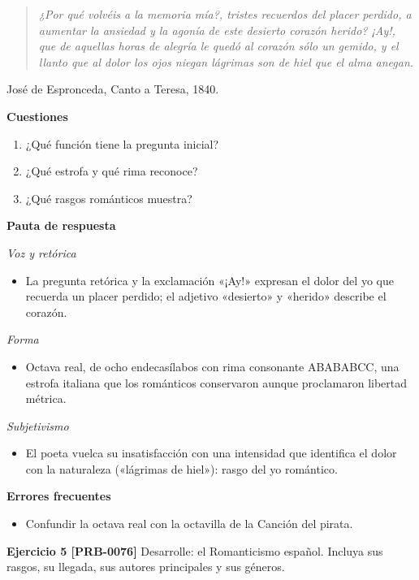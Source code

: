 \documentclass{book}
\begin{document}
\begin{quote}
\itshape ¿Por qué volvéis a la memoria mía?, tristes recuerdos del placer perdido, a aumentar la ansiedad y la agonía de este desierto corazón herido? ¡Ay!, que de aquellas horas de alegría le quedó al corazón sólo un gemido, y el llanto que al dolor los ojos niegan lágrimas son de hiel que el alma anegan.
\end{quote}
{\noindent\footnotesize José de Espronceda, Canto a Teresa, 1840.\par}

\noindent\textbf{Cuestiones}
\begin{enumerate}
\item ¿Qué función tiene la pregunta inicial?
\item ¿Qué estrofa y qué rima reconoce?
\item ¿Qué rasgos románticos muestra?
\end{enumerate}

\noindent\textbf{Pauta de respuesta}

\noindent\textit{Voz y retórica}
\begin{itemize}
\item La pregunta retórica y la exclamación «¡Ay!» expresan el dolor del yo que recuerda un placer perdido; el adjetivo «desierto» y «herido» describe el corazón.
\end{itemize}

\noindent\textit{Forma}
\begin{itemize}
\item Octava real, de ocho endecasílabos con rima consonante ABABABCC, una estrofa italiana que los románticos conservaron aunque proclamaron libertad métrica.
\end{itemize}

\noindent\textit{Subjetivismo}
\begin{itemize}
\item El poeta vuelca su insatisfacción con una intensidad que identifica el dolor con la naturaleza («lágrimas de hiel»): rasgo del yo romántico.
\end{itemize}

\noindent\textbf{Errores frecuentes}
\begin{itemize}
\item Confundir la octava real con la octavilla de la Canción del pirata.
\end{itemize}

\noindent\textbf{Ejercicio 5 [PRB-0076]}
Desarrolle: el Romanticismo español. Incluya sus rasgos, su llegada, sus autores principales y sus géneros.
\end{document}
